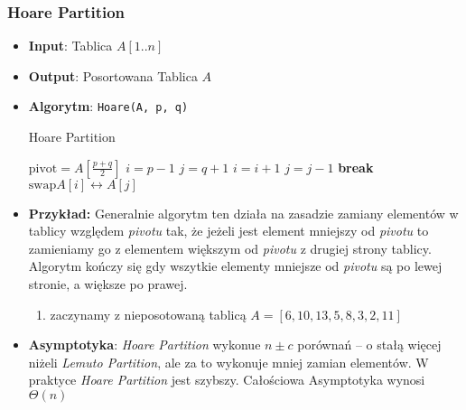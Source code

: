 \documentclass[11pt,a4paper]{article}
\begin{document}
\subsubsection{Hoare Partition}
\begin{itemize}
    \item \textbf{Input}: Tablica $A[1..n]$
    \item \textbf{Output}: Posortowana Tablica $A$
    \item \textbf{Algorytm}: \texttt{Hoare(A, p, q)}
        \begin{algorithm}
            \caption{Hoare Partition}
            \begin{algorithmic}[1]
                \State $\text{pivot} = A[\frac{p+q}{2}]$
                \State $i = p-1$
                \State $j = q+1$
                \State $i = i + 1$
                \State $j = j - 1$
                \State \textbf{break}
                \EndIf
                \EndWhile
                \State $\text{swap} A[i] \leftrightarrow A[j]$
                \EndWhile
                \EndProcedure
            \end{algorithmic}
        \end{algorithm}
    \item \textbf{Przykład:}
        Generalnie algorytm ten działa na zasadzie zamiany elementów w tablicy względem \textit{pivotu} tak, że jeżeli jest element mniejszy od \textit{pivotu} to zamieniamy go z elementem większym od \textit{pivotu} z drugiej strony tablicy. Algorytm kończy się gdy wszytkie elementy mniejsze od \textit{pivotu} są po lewej stronie, a większe po prawej.
        \begin{enumerate}
            \item zaczynamy z nieposotowaną tablicą $A = [6,10,13,5,8,3,2,11]$
        \end{enumerate}
    \item \textbf{Asymptotyka}:
        \textit{Hoare Partition} wykonue $n\pm c$ porównań -- o stałą więcej niżeli \textit{Lemuto Partition}, ale za to wykonuje mniej zamian elementów. W praktyce \textit{Hoare Partition} jest szybszy. Całościowa Asymptotyka wynosi $\Theta(n)$
\end{itemize}
\end{document}
